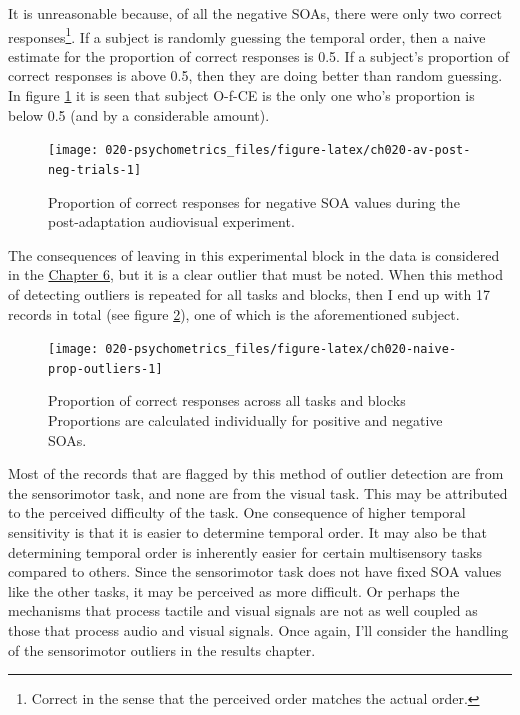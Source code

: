 \documentclass[11pt, oneside, openany]{scrbook}
\begin{document}
It is unreasonable because, of all the negative SOAs, there were only two correct responses\footnote{Correct in the sense that the perceived order matches the actual order.}. If a subject is randomly guessing the temporal order, then a naive estimate for the proportion of correct responses is 0.5. If a subject's proportion of correct responses is above 0.5, then they are doing better than random guessing. In figure \ref{fig:ch020-av-post-neg-trials} it is seen that subject O-f-CE is the only one who's proportion is below 0.5 (and by a considerable amount).

\begin{figure}

{\centering \texttt{[image: 020-psychometrics\_files/figure-latex/ch020-av-post-neg-trials-1]} 

}

\caption{Proportion of correct responses for negative SOA values during the post-adaptation audiovisual experiment.}\label{fig:ch020-av-post-neg-trials}
\end{figure}

The consequences of leaving in this experimental block in the data is considered in the \protect\hyperlink{results}{Chapter 6}, but it is a clear outlier that must be noted. When this method of detecting outliers is repeated for all tasks and blocks, then I end up with 17 records in total (see figure \ref{fig:ch020-naive-prop-outliers}), one of which is the aforementioned subject.

\begin{figure}

{\centering \texttt{[image: 020-psychometrics\_files/figure-latex/ch020-naive-prop-outliers-1]} 

}

\caption{Proportion of correct responses across all tasks and blocks Proportions are calculated individually for positive and negative SOAs.}\label{fig:ch020-naive-prop-outliers}
\end{figure}

Most of the records that are flagged by this method of outlier detection are from the sensorimotor task, and none are from the visual task. This may be attributed to the perceived difficulty of the task. One consequence of higher temporal sensitivity is that it is easier to determine temporal order. It may also be that determining temporal order is inherently easier for certain multisensory tasks compared to others. Since the sensorimotor task does not have fixed SOA values like the other tasks, it may be perceived as more difficult. Or perhaps the mechanisms that process tactile and visual signals are not as well coupled as those that process audio and visual signals. Once again, I'll consider the handling of the sensorimotor outliers in the results chapter.
\end{document}
